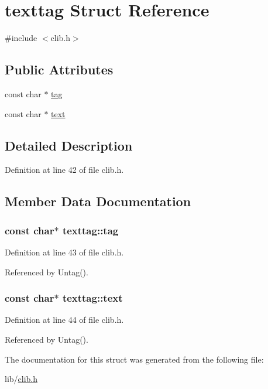 \hypertarget{structtexttag}{}\section{texttag Struct Reference}
\label{structtexttag}


{\ttfamily \#include $<$clib.\+h$>$}

\subsection*{Public Attributes}
\begin{DoxyCompactItemize}
\item 
const char $\ast$ \hyperlink{structtexttag_abdc442e3844ddc31013194f47bc098f8}{tag}
\item 
const char $\ast$ \hyperlink{structtexttag_a50dedeb9b187ea41d2465a58e68ec424}{text}
\end{DoxyCompactItemize}


\subsection{Detailed Description}


Definition at line 42 of file clib.\+h.



\subsection{Member Data Documentation}
\subsubsection[{\texorpdfstring{tag}{tag}}]{\setlength{\rightskip}{0pt plus 5cm}const char$\ast$ texttag\+::tag}\hypertarget{structtexttag_abdc442e3844ddc31013194f47bc098f8}{}\label{structtexttag_abdc442e3844ddc31013194f47bc098f8}


Definition at line 43 of file clib.\+h.



Referenced by Untag().

\subsubsection[{\texorpdfstring{text}{text}}]{\setlength{\rightskip}{0pt plus 5cm}const char$\ast$ texttag\+::text}\hypertarget{structtexttag_a50dedeb9b187ea41d2465a58e68ec424}{}\label{structtexttag_a50dedeb9b187ea41d2465a58e68ec424}


Definition at line 44 of file clib.\+h.



Referenced by Untag().



The documentation for this struct was generated from the following file\+:\begin{DoxyCompactItemize}
\item 
lib/\hyperlink{clib_8h}{clib.\+h}\end{DoxyCompactItemize}

